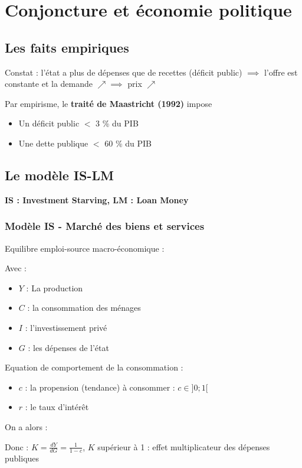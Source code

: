 \chapter{Conjoncture et économie politique}
\section{Les faits empiriques}
Constat : l'état a plus de dépenses que de recettes  (déficit public) $\implies$ l'offre est constante et la demande $\nearrow \implies$ prix $\nearrow$ \newline

Par empirisme, le \textbf{traité de Maastricht (1992)} impose
\begin{center}
    \begin{itemize}
        \item Un déficit public $<$ 3 \% du PIB
        \item Une dette publique $<$ 60 \% du PIB
    \end{itemize}
\end{center}
\newpage
\section{Le modèle IS-LM} 
\begin{center}
    \textbf{IS : Investment Starving, LM : Loan Money}
\end{center}
\subsection{Modèle IS - Marché des biens et services}
Equilibre emploi-source macro-économique : 
\begin{center}
    \Large{}
\end{center}
Avec :
\begin{itemize}
    \item $Y$ : La production
    \item $C$ : la consommation des ménages
    \item $I$ : l'investissement privé
    \item $G$ : les dépenses de l'état
\end{itemize}
Equation de comportement de la consommation : 
\begin{center}
    \Large{}
\end{center}
\begin{itemize}
    \item $c$ : la propension (tendance) à consommer : $c \in ]0;1[$
\end{itemize}
\begin{center}
    \Large{}
\end{center}
\begin{itemize}
    \item $r$  : le taux d'intérêt
\end{itemize}
 On a alors : 
\begin{center}
    \Large{}
\end{center}
Donc : 
\Large{$K = \frac{dY}{dG} = \frac{1}{1-c}$}, $K$ supérieur à 1 
: effet multiplicateur des dépenses publiques
\newpage
